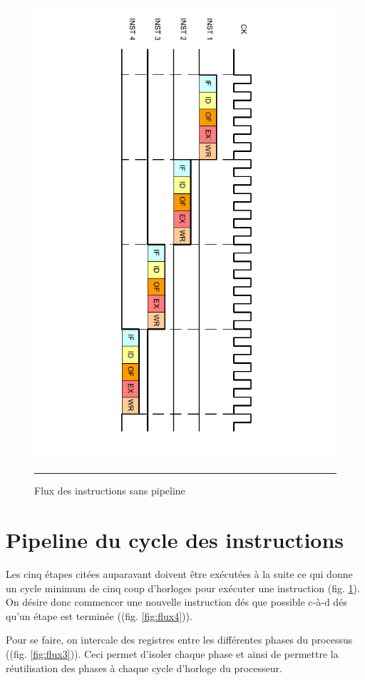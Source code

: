 \begin{figure}[htb]
  \centering
  \includegraphics[angle=90, width=12cm,trim=60 1 60 1,clip]{./Figures/cpu/wpipeline2.pdf}
  \rule{35em}{0.5pt}
  \caption[flux2]{Flux des instructions sans pipeline}
  \label{fig:flux2}
\end{figure}
 
\section{Pipeline du cycle des instructions}
Les cinq étapes citées auparavant doivent être exécutées à la suite ce qui donne un cycle minimum de cinq coup d'horloges pour exécuter une instruction (fig. \ref{fig:flux2}). On désire donc commencer une nouvelle instruction dés que possible c-à-d dés qu'un étape est terminée ((fig. \ref{fig:flux4})).

Pour se faire, on intercale des registres entre les différentes phases du processus ((fig. \ref{fig:flux3})). Ceci permet d'isoler chaque phase et ainsi de permettre la réutilisation des phases à chaque cycle d'horloge du processeur.

